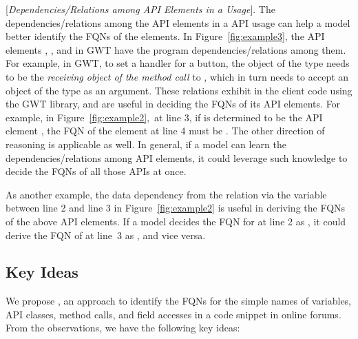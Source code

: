 \vspace{2pt}
 [{\em Dependencies/Relations among API
    Elements in a Usage}]. The dependencies/relations among the API
elements in a API usage can help a model better identify the FQNs of
the elements.  In Figure~\ref{fig:example3}, the API elements
, , and  in GWT
have the program dependencies/relations among them. For example, in
GWT, to set a handler for a button, the object of the type
 needs to be the {\em receiving object of the method
  call} to , which in turn needs to accept an
object of the type  as an argument. These relations
exhibit in the client code using the GWT library, and are useful in
deciding the FQNs of its API elements. For example, in
Figure~\ref{fig:example2},~at line 3, if  is
determined to be the API element
, the
FQN of the element at line 4 must be
.  The
other direction of reasoning is applicable as well. In general, if a
model can learn the dependencies/relations among API elements, it
could leverage such knowledge to decide the FQNs of all those APIs at once.


As another example, the data dependency from the 
relation via the variable  between line 2 and line 3 in
Figure~\ref{fig:example2} is useful in deriving the FQNs of the
above API elements. If a model decides the FQN for  at
line 2 as , it
could derive the FQN of  at line~3 as
,
and vice versa.


\subsection{Key Ideas}
\label{sec:key}

We propose {\tool}, an approach to identify the FQNs for the simple
names of variables, API classes, method calls, and field accesses in a
code snippet in online forums. From the observations, we have the
following key ideas:

